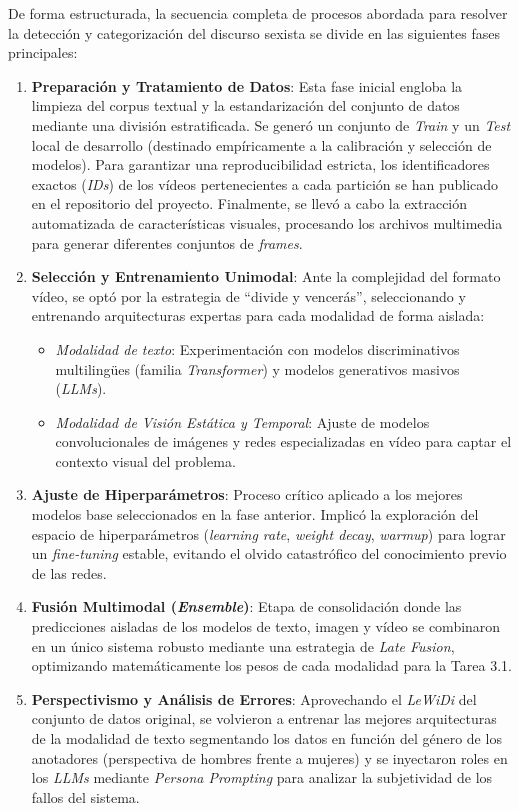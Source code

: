 De forma estructurada, la secuencia completa de procesos abordada para resolver la detección y categorización del discurso sexista se divide en las siguientes fases principales:
\begin{enumerate}
    \item \textbf{Preparación y Tratamiento de Datos}: Esta fase inicial engloba la limpieza del corpus textual y la estandarización del conjunto de datos mediante una división estratificada. Se generó un conjunto de \textit{Train} y un \textit{Test} local de desarrollo (destinado empíricamente a la calibración y selección de modelos). Para garantizar una reproducibilidad estricta, los identificadores exactos (\textit{IDs}) de los vídeos pertenecientes a cada partición se han publicado en el repositorio del proyecto. Finalmente, se llevó a cabo la extracción automatizada de características visuales, procesando los archivos multimedia para generar diferentes conjuntos de \textit{frames}.
    \item \textbf{Selección y Entrenamiento Unimodal}: Ante la complejidad del formato vídeo, se optó por la estrategia de ``divide y vencerás'', seleccionando y entrenando arquitecturas expertas para cada modalidad de forma aislada:
    \begin{itemize}
        \item \textit{Modalidad de texto}: Experimentación con modelos discriminativos multilingües (familia \textit{Transformer}) y modelos generativos masivos (\textit{LLMs}).
        \item \textit{Modalidad de Visión Estática y Temporal}: Ajuste de modelos convolucionales de imágenes y redes especializadas en vídeo para captar el contexto visual del problema.
    \end{itemize}
    \item \textbf{Ajuste de Hiperparámetros}: Proceso crítico aplicado a los mejores modelos base seleccionados en la fase anterior. Implicó la exploración del espacio de hiperparámetros (\textit{learning rate}, \textit{weight decay}, \textit{warmup}) para lograr un \textit{fine-tuning} estable, evitando el olvido catastrófico del conocimiento previo de las redes. 
    \item \textbf{Fusión Multimodal (\textit{Ensemble})}: Etapa de consolidación donde las predicciones aisladas de los modelos de texto, imagen y vídeo se combinaron en un único sistema robusto mediante una estrategia de \textit{Late Fusion}, optimizando matemáticamente los pesos de cada modalidad para la Tarea 3.1.
    \item \textbf{Perspectivismo y Análisis de Errores}: Aprovechando el \textit{LeWiDi} del conjunto de datos original, se volvieron a entrenar las mejores arquitecturas de la modalidad de texto segmentando los datos en función del género de los anotadores (perspectiva de hombres frente a mujeres) y se inyectaron roles en los \textit{LLMs} mediante \textit{Persona Prompting} para analizar la subjetividad de los fallos del sistema.  

\end{enumerate}

